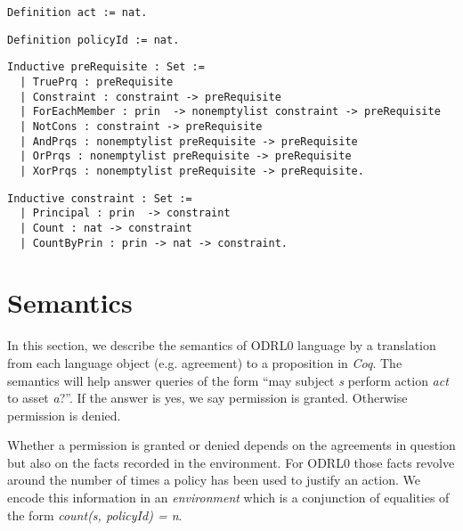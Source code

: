 \lstset{language=Coq}
\begin{lstlisting}[frame=single, caption={act},label={lst:actcoq}]
Definition act := nat.
\end{lstlisting}

\lstset{language=Coq}
\begin{lstlisting}[frame=single, caption={policyId},label={lst:policyIdcoq}]
Definition policyId := nat.
\end{lstlisting}

\lstset{language=Coq}
\begin{lstlisting}[frame=single, caption={preRequisite},label={lst:preRequisitecoq}]
Inductive preRequisite : Set :=
  | TruePrq : preRequisite
  | Constraint : constraint -> preRequisite 
  | ForEachMember : prin  -> nonemptylist constraint -> preRequisite
  | NotCons : constraint -> preRequisite 
  | AndPrqs : nonemptylist preRequisite -> preRequisite
  | OrPrqs : nonemptylist preRequisite -> preRequisite
  | XorPrqs : nonemptylist preRequisite -> preRequisite.
\end{lstlisting}

\lstset{language=Coq}
\begin{lstlisting}[frame=single, caption={constraint},label={lst:constraintcoq}]
Inductive constraint : Set :=
  | Principal : prin  -> constraint 
  | Count : nat -> constraint 
  | CountByPrin : prin -> nat -> constraint.
\end{lstlisting}


\section{Semantics}
\label{sec:Semantics}

In this section, we describe the semantics of ODRL0 language by a translation from each language object (e.g. agreement) to a proposition in \emph{Coq}. The semantics will help answer queries of the form ``may subject \emph{s} perform action \emph{act} to asset \emph{a}?''. If the answer is yes, we say permission is granted. Otherwise permission is denied. 

Whether a permission is granted or denied depends on the agreements in question but also on the facts recorded in the environment. For ODRL0 those facts revolve around the number of times a policy has been used to justify an action. We encode this information in an \emph{environment} which is a conjunction of equalities of the form \emph{count(s, policyId) = n}. 

